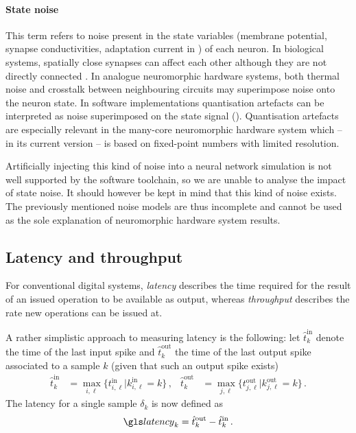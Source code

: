 \paragraph{State noise}
This term refers to noise present in the state variables (membrane potential, synapse conductivities, adaptation current in \AdEx) of each neuron. In biological systems, spatially close synapses can affect each other although they are not directly connected \cite{barbour1997intersynaptic}. In analogue neuromorphic hardware systems, both thermal noise and crosstalk between neighbouring circuits may superimpose noise onto the neuron state. In software implementations quantisation artefacts can be interpreted as noise superimposed on the state signal (\cf \SQNR \cite{lathi2009modern}). Quantisation artefacts are especially relevant in the many-core neuromorphic hardware system which -- in its current version -- is based on fixed-point numbers with limited resolution.

Artificially injecting this kind of noise into a neural network simulation is not well supported by the software toolchain, so we are unable to analyse the impact of state noise. It should however be kept in mind that this kind of noise exists. The previously mentioned noise models are thus incomplete and cannot be used as the sole explanation of neuromorphic hardware system results.

\subsection{Latency and throughput}
\label{sec:eval_latency}

For conventional digital systems, \emph{latency} describes the time required for the result of an issued operation to be available as output, whereas \emph{throughput} describes the rate new operations can be issued at.

A rather simplistic approach to measuring latency is the following: let $\hat t^{\mathrm{in}}_k$ denote the time of the last input spike and  $\hat t^{\mathrm{out}}_k$ the time of the last output spike associated to a sample $k$ (given that such an output spike exists)
\begin{align}
	\hat t^{\mathrm{in}}_k
		&= \max_{i, \ell} \{t^{\mathrm{in}}_{i, \ell} | k^{\mathrm{in}}_{i, \ell} = k \}\,, &
	\hat t^{\mathrm{out}}_k
		&= \max_{j, \ell} \{t^{\mathrm{out}}_{j, \ell} | k^{\mathrm{out}}_{j, \ell} = k \} \,.
\end{align}
The latency for a single sample $\delta_k$ is now defined as
\begin{align}
    \latency_k = \hat t^{\mathrm{out}}_k - \hat t^{\mathrm{in}}_k \,.
    \label{eqn:latency}
\end{align}

